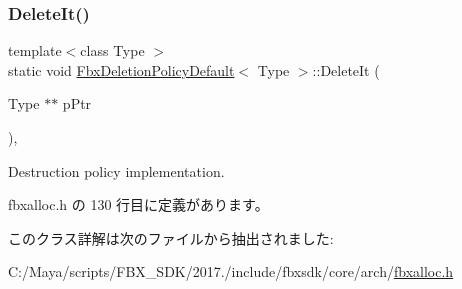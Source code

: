 \subsubsection{\texorpdfstring{Delete\+It()}{DeleteIt()}}
{\footnotesize\ttfamily template$<$class Type $>$ \\
static void \hyperlink{class_fbx_deletion_policy_default}{Fbx\+Deletion\+Policy\+Default}$<$ Type $>$\+::Delete\+It (\begin{DoxyParamCaption}\item[{Type $\ast$$\ast$}]{p\+Ptr }\end{DoxyParamCaption})\hspace{0.3cm}{\ttfamily [inline]}, {\ttfamily [static]}}



Destruction policy implementation. 



 fbxalloc.\+h の 130 行目に定義があります。



このクラス詳解は次のファイルから抽出されました\+:\begin{DoxyCompactItemize}
\item 
C\+:/\+Maya/scripts/\+F\+B\+X\+\_\+\+S\+D\+K/2017./include/fbxsdk/core/arch/\hyperlink{fbxalloc_8h}{fbxalloc.\+h}\end{DoxyCompactItemize}
